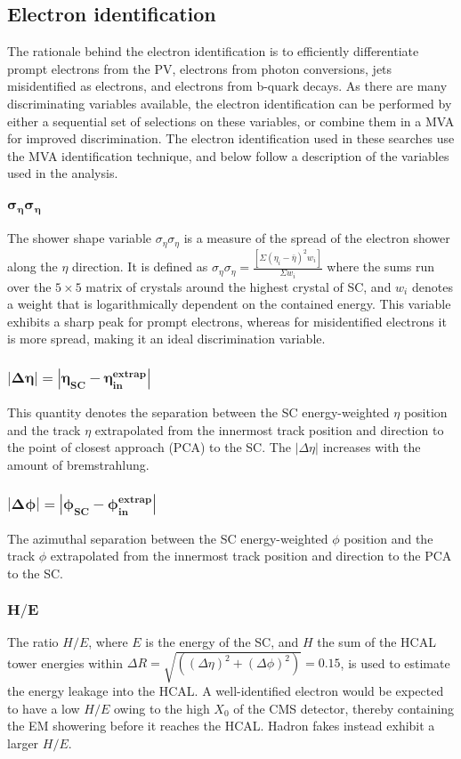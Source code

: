 \subsection*{Electron identification}
\noindent\justify
The rationale behind the electron identification is to efficiently differentiate prompt electrons from the PV, electrons from photon conversions, jets misidentified as electrons, and electrons from b-quark decays.  
As there are many discriminating variables available, the electron identification can be performed by either a sequential set of selections on these variables, or combine them in a MVA for improved discrimination.
The electron identification used in these searches use the MVA identification technique, and below follow a description of the variables used in the analysis. 
\subsubsection*{$\bm{\sigma_{\eta}\sigma_{\eta}}$}
\noindent\justify 
The shower shape variable $\sigma_{\eta}\sigma_{\eta}$ is a measure of the spread of the electron shower along the $\eta$ direction.
It is defined as $\sigma_{\eta}\sigma_{\eta}=\frac{[\Sigma (\eta_i-\bar{\eta})^{2}w_i]}{\Sigma w_i}$ where the sums run over the $5\times5$ matrix of crystals around the highest \ET crystal of SC, and $w_i$ denotes a weight that is logarithmically dependent on the contained energy.
This variable exhibits a sharp peak for prompt electrons, whereas for misidentified electrons it is more spread, making it an ideal discrimination variable.  
\subsubsection*{$\bm{|\Delta \eta| = |\eta_{SC}-\eta_{in}^{extrap}|}$}
\noindent\justify 
This quantity denotes the separation between the SC energy-weighted $\eta$ position and the track $\eta$ extrapolated from the innermost track position and direction to the point of closest approach (PCA) to the SC.
The $|\Delta \eta|$ increases with the amount of bremstrahlung. 
\subsubsection*{$\bm{|\Delta \phi| = |\phi_{SC}-\phi_{in}^{extrap}|}$}
\noindent\justify 
The azimuthal separation between the SC energy-weighted $\phi$ position and the track $\phi$ extrapolated from the innermost track position and direction to the PCA to the SC.
\subsubsection*{$\bm{H/E}$}
\noindent\justify  
The ratio $H/E$, where $E$ is the energy of the SC, and $H$ the sum of the HCAL tower energies within $\Delta R = \sqrt{((\Delta \eta )^{2}+ (\Delta \phi )^{2})} = 0.15$, is used to estimate the energy leakage into the HCAL. 
A well-identified electron would be expected to have a low $H/E$ owing to the high $X_0$ of the CMS detector, thereby containing the EM showering before it reaches the HCAL. 
Hadron fakes instead exhibit a larger $H/E$. 
